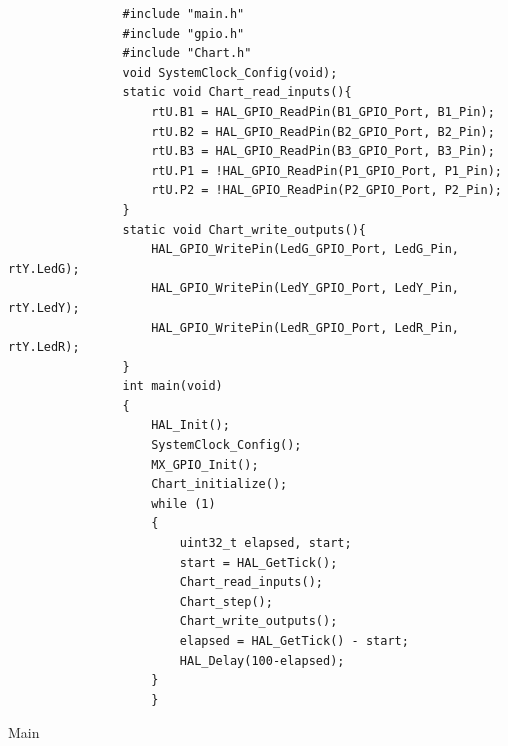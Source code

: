         \begin{listing}[!ht]
            \begin{verbatim}
                #include "main.h"
                #include "gpio.h"
                #include "Chart.h"
                void SystemClock_Config(void);
                static void Chart_read_inputs(){
                    rtU.B1 = HAL_GPIO_ReadPin(B1_GPIO_Port, B1_Pin);
                    rtU.B2 = HAL_GPIO_ReadPin(B2_GPIO_Port, B2_Pin);
                    rtU.B3 = HAL_GPIO_ReadPin(B3_GPIO_Port, B3_Pin);
                    rtU.P1 = !HAL_GPIO_ReadPin(P1_GPIO_Port, P1_Pin);
                    rtU.P2 = !HAL_GPIO_ReadPin(P2_GPIO_Port, P2_Pin);
                }
                static void Chart_write_outputs(){
                    HAL_GPIO_WritePin(LedG_GPIO_Port, LedG_Pin, rtY.LedG);
                    HAL_GPIO_WritePin(LedY_GPIO_Port, LedY_Pin, rtY.LedY);
                    HAL_GPIO_WritePin(LedR_GPIO_Port, LedR_Pin, rtY.LedR);
                }
                int main(void)
                {
                    HAL_Init();
                    SystemClock_Config();
                    MX_GPIO_Init();
                    Chart_initialize();
                    while (1)
                    {
                        uint32_t elapsed, start;
                        start = HAL_GetTick();
                        Chart_read_inputs();
                        Chart_step();
                        Chart_write_outputs();
                        elapsed = HAL_GetTick() - start;
                        HAL_Delay(100-elapsed);
                    }
                    }
            \end{verbatim}
        \caption{Main}
    \label{listing:1}
\end{listing}